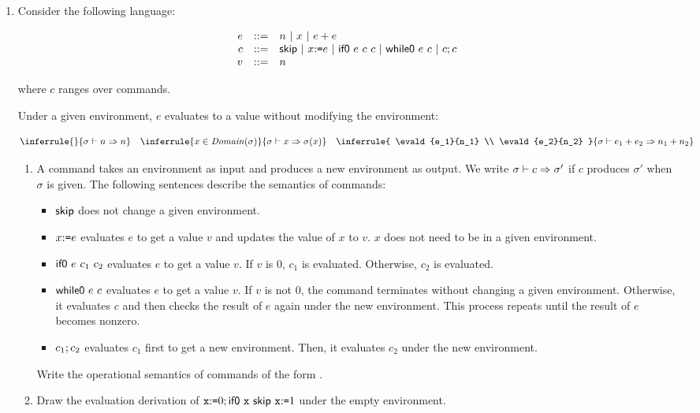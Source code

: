 \begin{enumerate}
\item Consider the following language:

\vspace{-1em}

\[
\begin{array}{rcl}
  e & ::= & n\ |\ x\ |\ e+e \\
  c & ::= & \textsf{skip}\ |\ x{:}\texttt{=} e\ |\ \textsf{if0}\ e\ c\ c
  \ |\ \textsf{while0}\ e\ c\ |\ c;c \\
  v & ::= & n \\
\end{array}
\]

where $c$ ranges over commands.

Under a given environment, $e$ evaluates to a value without modifying the
environment:

\[
  \inferrule
  {}
  { \evald{n}{n} }
  \quad
  \inferrule
  { x\in\dom{\sigma} }
  { \evald{x}{\sigma(x)} }
  \quad
  \inferrule
  { \evald{e_1}{n_1} \\ \evald{e_2}{n_2} }
  { \evald{\eadd{e_1}{e_2}}{n_1+n_2} }
\]

\begin{enumerate}
  \item
    A command takes an environment as input and produces a new environment as
    output. We write $\sigma\vdash c\Rightarrow\sigma'$ if $c$ produces $\sigma'$ when
    $\sigma$ is given.
    The following sentences describe the semantics of commands:
    \begin{itemize}
      \item $\textsf{skip}$ does not change a given environment.
      \item $x{:}\texttt{=} e$ evaluates $e$ to get a value $v$ and
        updates the value of $x$ to $v$. $x$ does not need to be in a given
        environment.
      \item $\textsf{if0}\ e\ c_1\ c_2$ evaluates $e$ to get a value $v$.
        If $v$ is $0$, $c_1$ is evaluated. Otherwise, $c_2$ is evaluated.
      \item $\textsf{while0}\ e\ c$ evaluates $e$ to get a value $v$.
        If $v$ is not $0$, the command terminates without changing a given
        environment. Otherwise, it evaluates $c$ and then checks the result of $e$ again
        under the new environment.
        This process repeats until the result of $e$ becomes nonzero.
      \item $c_1;c_2$ evaluates $c_1$ first to get a new environment.
        Then, it evaluates $c_2$ under the new environment.
    \end{itemize}
    Write the operational semantics of commands of the form
    .

  \item
    Draw the evaluation derivation of
    $\texttt{x}{:}\texttt{=}0;\textsf{if0}\ \texttt{x}\ \textsf{skip}\ \texttt{x}{:}\texttt{=}1$
    under the empty environment.
\end{enumerate}

\end{enumerate}
